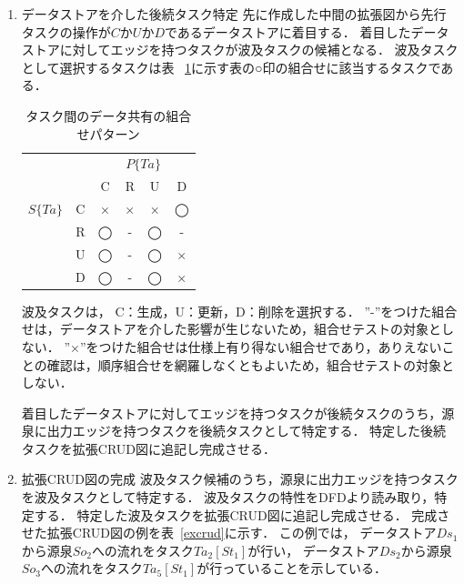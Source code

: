 \begin{enumerate}
\item データストアを介した後続タスク特定
先に作成した中間の拡張図から先行タスクの操作が$C$か$U$か$D$であるデータストアに着目する．
着目したデータストアに対してエッジを持つタスクが波及タスクの候補となる．
波及タスクとして選択するタスクは表 ~\ref{table:3}に示す表の○印の組合せに該当するタスクである．
\begin{table}[h]
\caption{タスク間のデータ共有の組合せパターン}
\label{table:3}
\begin{center}
\begin{tabular}{c|c||c|c|c|c}
\hline
\multicolumn{2}{c||}{}& \multicolumn{4}{c}{$P\{Ta\}$}\\
\multicolumn{2}{c||}{}& C & R & U& D\\
\hline\hline
$S\{Ta\}$&C&×&×&×&◯\\
\cline{2-6}
&R&◯&-&◯& -\\
\cline{2-6}
&U&◯&-&◯&×\\
\cline{2-6}
&D&◯&- &◯&×\\
\hline
\end{tabular}
\end{center}
\end{table}
波及タスクは， C：生成，U：更新，D：削除を選択する．
”-”をつけた組合せは，データストアを介した影響が生じないため，組合せテストの対象としない．
”×”をつけた組合せは仕様上有り得ない組合せであり，ありえないことの確認は，順序組合せを網羅しなくともよいため，組合せテストの対象としない．

着目したデータストアに対してエッジを持つタスクが後続タスクのうち，源泉に出力エッジを持つタスクを後続タスクとして特定する．
特定した後続タスクを拡張CRUD図に追記し完成させる．
\item 拡張CRUD図の完成
波及タスク候補のうち，源泉に出力エッジを持つタスクを波及タスクとして特定する．
波及タスクの特性をDFDより読み取り，特定する．
特定した波及タスクを拡張CRUD図に追記し完成させる．
完成させた拡張CRUD図の例を表~\ref{excrud}に示す．
この例では，
データストア$Ds_1$から源泉$So_2$への流れをタスク$Ta_2[St_1]$が行い，
データストア$Ds_2$から源泉$So_3$への流れをタスク$Ta_5[St_1]$が行っていることを示している．
\end{enumerate}
